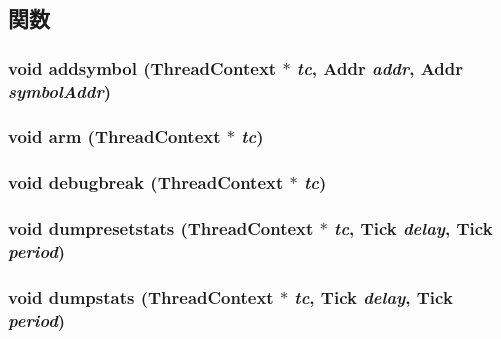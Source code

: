 \subsection{関数}
\hypertarget{namespacePseudoInst_a5a43d039916d7f4388d084bcc450162d}{
\subsubsection[{addsymbol}]{\setlength{\rightskip}{0pt plus 5cm}void addsymbol ({\bf ThreadContext} $\ast$ {\em tc}, \/  {\bf Addr} {\em addr}, \/  {\bf Addr} {\em symbolAddr})}}
\label{namespacePseudoInst_a5a43d039916d7f4388d084bcc450162d}
\hypertarget{namespacePseudoInst_a04d21e0b7e79b39e05106d93cac907a7}{
\subsubsection[{arm}]{\setlength{\rightskip}{0pt plus 5cm}void arm ({\bf ThreadContext} $\ast$ {\em tc})}}
\label{namespacePseudoInst_a04d21e0b7e79b39e05106d93cac907a7}
\hypertarget{namespacePseudoInst_a443ca28fda37e0c3211abfc3d41fd999}{
\subsubsection[{debugbreak}]{\setlength{\rightskip}{0pt plus 5cm}void debugbreak ({\bf ThreadContext} $\ast$ {\em tc})}}
\label{namespacePseudoInst_a443ca28fda37e0c3211abfc3d41fd999}
\hypertarget{namespacePseudoInst_ac41c805ee58cc83abd878e49d9d9ff42}{
\subsubsection[{dumpresetstats}]{\setlength{\rightskip}{0pt plus 5cm}void dumpresetstats ({\bf ThreadContext} $\ast$ {\em tc}, \/  {\bf Tick} {\em delay}, \/  {\bf Tick} {\em period})}}
\label{namespacePseudoInst_ac41c805ee58cc83abd878e49d9d9ff42}
\hypertarget{namespacePseudoInst_a530073934a148e51b0274c3ebaa96f42}{
\subsubsection[{dumpstats}]{\setlength{\rightskip}{0pt plus 5cm}void dumpstats ({\bf ThreadContext} $\ast$ {\em tc}, \/  {\bf Tick} {\em delay}, \/  {\bf Tick} {\em period})}}
